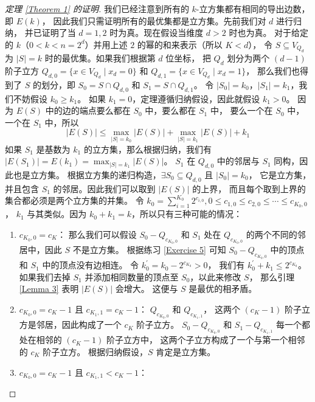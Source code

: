 \documentclass[12pt, a4paper]{article}
\begin{document}
\begin{proof}[定理 \ref{Theorem 1} 的证明]
我们已经注意到所有的 $k$-立方集都有相同的导出边数，即 $E(k)$，
因此我们只需证明所有的最优集都是立方集。先前我们对 $d$ 进行归纳，
并已证明了当 $d = 1, 2$ 时为真。现在假设当维度 $d > 2$ 时也为真。
对于给定的 $k$（$0 < k < n = 2^d$）并用上述 $2$ 的幂的和来表示（所以 $K < d$），
令 $S \subseteq V_{Q_d}$ 为 $|S| = k$ 时的最优集。如果我们根据第 $d$ 位坐标，
把 $Q_d$ 划分为两个 $(d − 1)$ 阶子立方
$Q_{d, 0} = \{x \in V_{Q_d} \mid x_d = 0\}$ 和
$Q_{d, 1} = \{x \in V_{Q_d} \mid x_d = 1\}$，
那么我们也得到了 $S$ 的划分，即
$S_0 = S \cap Q_{d, 0}$ 和 $S_1 = S \cap Q_{d, 1}$。
令 $|S_0| = k_0$，$|S_1| = k_1$，我们不妨假设 $k_0 \ge k_1$。
如果 $k_1 = 0$，定理遵循归纳假设，因此就假设 $k_1 > 0$。
因为 $E(S)$ 中的边的端点要么都在 $S_0$ 中，要么都在 $S_1$ 中，
要么一个在 $S_0$ 中，一个在 $S_1$ 中，所以
\begin{equation*}
|E(S)| \le \max_{|S| = k_0} |E(S)| + \max_{|S| = k_1} |E(S)| + k_1
\end{equation*}
如果 $S_1$ 是基数为 $k_1$ 的立方集，那么根据归纳，我们有
$|E(S_1)| = E(k_1) = \max_{|S| = k_1} |E(S)|$。
$S_1$ 在 $Q_{d, 0}$ 中的邻居与 $S_1$ 同构，因此也是立方集。
根据立方集的递归构造，$\exists S_0 \subseteq Q_{d, 0}$ 且 $|S_0| = k_0$，
它是立方集，并且包含 $S_1$ 的邻居。因此我们可以取到 $|E(S)|$ 的上界，
而且每个取到上界的集合都必须是两个立方集的并集。
令 $k_0 = \sum_{i = 1}^{K_0} 2^{c_{i, 0}}, 0 \le c_{1, 0} \le c_{2, 0} \le \cdots \le c_{K_0, 0}$，
$k_1$ 与其类似。因为 $k_0 + k_1 = k$，所以只有三种可能的情况：
\begin{enumerate}[(1)]
	\item $c_{K_0, 0} = c_K$：
		那么我们可以假设 $S_0 - Q_{c_{K_0, 0}}$ 和 $S_1$ 处在
		$Q_{c_{K_0, 0}}$ 的两个不同的邻居中，因此 $S$ 不是立方集。
		根据练习 \ref{Exercise 5} 可知 $S_0 - Q_{c_{K_0, 0}}$
		中的顶点和 $S_1$ 中的顶点没有边相连。
		令 $k_0^{'} = k_0 - 2^{c_{K_0}} > 0$，
		我们有 $k_0^{'} + k_1 \le 2^{c_{K_0}}$。
		如果我们去掉 $S_1$ 并添加相同数量的顶点至 $S_0$，以此来修改 $S$，
		那么引理 \ref{Lemma 3} 表明 $|E(S)|$ 会增大。
		这便与 $S$ 是最优的相矛盾。
	\item $c_{K_0, 0} = c_K - 1$ 且 $c_{K_1, 1} = c_K - 1$：
		$Q_{c_{K_0, 0}}$ 和 $Q_{c_{K_1, 1}}$，
		这两个 $(c_K − 1)$ 阶子立方是邻居，因此构成了一个 $c_K$ 阶子立方。
		$S_0 - Q_{c_{K_0, 0}}$ 和 $S_1 - Q_{c_{K_1, 1}}$
		每一个都处在相邻的 $(c_K − 1)$ 阶子立方中，
		这两个子立方构成了一个与第一个相邻的 $c_K$ 阶子立方。
		根据归纳假设，$S$ 肯定是立方集。
	\item $c_{K_0, 0} = c_K - 1$ 且 $c_{K_1, 1} < c_K - 1$：

\end{enumerate}
\end{proof}
\end{document}
